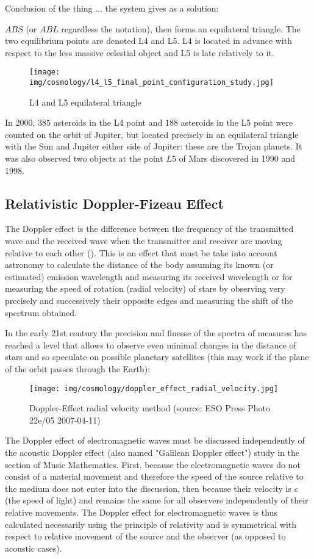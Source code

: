 	Conclusion of the thing ... the system gives as a solution:
	
	$ABS$ (or $ABL$ regardless the notation), then forms an equilateral triangle. The two equilibrium points are denoted L4 and L5. L4 is located in advance with respect to the less massive celestial object and L5 is late relatively to it.
	\begin{figure}[H]
		\centering
		\texttt{[image: img/cosmology/l4\_l5\_final\_point\_configuration\_study.jpg]}	
		\caption[]{L4 and L5 equilateral triangle}
	\end{figure}
	In 2000, $385$ asteroids in the L4 point and $188$ asteroids in the L5 point were counted on the orbit of Jupiter, but located precisely in an equilateral triangle with the Sun and Jupiter either side of Jupiter: these are the Trojan planets. It was also observed two objects at the point $L5$ of Mars discovered in 1990 and 1998.
	
	\pagebreak
	\subsection{Relativistic Doppler-Fizeau Effect}
	The Doppler effect is the difference between the frequency of the transmitted wave and the received wave when the transmitter and receiver are moving relative to each other (). This is an effect that must be take into account astronomy to calculate the distance of the body assuming its known (or estimated)  emission wavelength and measuring its received wavelength or for measuring the speed of rotation (radial velocity) of stars by observing very precisely and successively their opposite edges and measuring the shift of the spectrum obtained.

	In the early 21st century the precision and finesse of the spectra of measures has reached a level that allows to observe even minimal changes in the distance of stars and so speculate on possible planetary satellites (this may work if the plane of the orbit passes through the Earth):
	\begin{figure}[H]
		\centering
		\texttt{[image: img/cosmology/doppler\_effect\_radial\_velocity.jpg]}
		\caption[Doppler-Effect radial velocity method]{Doppler-Effect radial velocity method (source: ESO Press Photo 22e/05 2007-04-11)}
	\end{figure}
	The Doppler effect of electromagnetic waves must be discussed independently of the acoustic Doppler effect (also named "Galilean Doppler effect") study in the section of Music Mathematics. First, because the electromagnetic waves do not consist of a material movement and therefore the speed of the source relative to the medium does not enter into the discussion, then because their velocity is $c$ (the speed of light) and remains the same for all observers independently of their relative movements. The Doppler effect for electromagnetic waves is thus calculated necessarily using the principle of relativity and is symmetrical with respect to relative movement of the source and the observer (as opposed to acoustic cases).
	
